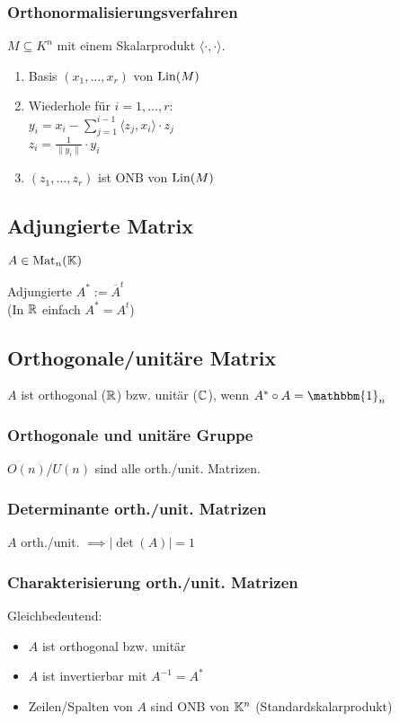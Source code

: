 \subsubsection*{Orthonormalisierungsverfahren}
$M\subseteq K^n$ mit einem Skalarprodukt $\langle\cdot,\cdot\rangle$.
\begin{enumerate}
	\item Basis $(x_1,\dots,x_r)$ von $\operatorname{Lin}(M)$
	\item Wiederhole für $i=1,\dots,r$: \\
		$\displaystyle y_i = x_i - \sum_{j=1}^{i-1}\langle z_j,x_i \rangle\cdot z_j$ \\
		$\displaystyle z_i = \frac{1}{\|y_i\|}\cdot y_i$
	\item $(z_1,\dots,z_r)$ ist ONB von $\operatorname{Lin}(M)$
\end{enumerate}

\subsection*{Adjungierte Matrix}
$A\in\operatorname{Mat}_n(\mathbb{K})$

Adjungierte $A^* := \overline{A}^t$ \\
(In $\mathbb{R}$ einfach $A^*=A^t$)

\subsection*{Orthogonale/unitäre Matrix}
$A$ ist orthogonal ($\mathbb{R}$) bzw. unitär ($\mathbb{C}$), wenn $A^* \circ A = \mathbbm{1}_n$

\subsubsection*{Orthogonale und unitäre Gruppe}
$O(n)$/$U(n)$ sind alle orth./unit. Matrizen.

\subsubsection*{Determinante orth./unit. Matrizen}
$A$ orth./unit. $\implies |\det(A)|=1$

\subsubsection*{Charakterisierung orth./unit. Matrizen}
Gleichbedeutend:
\begin{itemize}
	\item $A$ ist orthogonal bzw. unitär
	\item $A$ ist invertierbar mit $A^{-1}=A^*$
	\item Zeilen/Spalten von $A$ sind ONB von $\mathbb{K}^n$ (Standardskalarprodukt)
\end{itemize}

